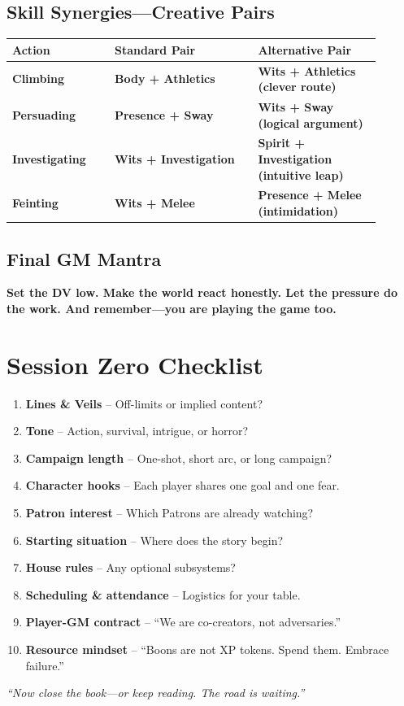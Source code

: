 \documentclass[10pt,twocolumn]{article} %
\begin{document}
\subsection{Skill Synergies---Creative Pairs}
\begin{coretable}
\begin{tabular}{>{\bfseries}p{0.25\linewidth} >{\bfseries}p{0.35\linewidth} >{\bfseries}p{0.3\linewidth}}
\toprule
\textbf{Action} & \textbf{Standard Pair} & \textbf{Alternative Pair} \\
\midrule
Climbing & Body + Athletics & Wits + Athletics (clever route) \\
Persuading & Presence + Sway & Wits + Sway (logical argument) \\
Investigating & Wits + Investigation & Spirit + Investigation (intuitive leap) \\
Feinting & Wits + Melee & Presence + Melee (intimidation) \\
\bottomrule
\end{tabular}
\end{coretable}

\subsection{Final GM Mantra}
\begin{sidebar}
    \textbf{Set the DV low. Make the world react honestly. Let the pressure do the work. And remember---you are playing the game too.}
\end{sidebar}

\section{Session Zero Checklist}
\begin{enumerate}[leftmargin=*]
    \item \textbf{Lines \& Veils} -- Off-limits or implied content?
    \item \textbf{Tone} -- Action, survival, intrigue, or horror?
    \item \textbf{Campaign length} -- One-shot, short arc, or long campaign?
    \item \textbf{Character hooks} -- Each player shares one goal and one fear.
    \item \textbf{Patron interest} -- Which Patrons are already watching?
    \item \textbf{Starting situation} -- Where does the story begin?
    \item \textbf{House rules} -- Any optional subsystems?
    \item \textbf{Scheduling \& attendance} -- Logistics for your table.
    \item \textbf{Player-GM contract} -- ``We are co-creators, not adversaries.''
    \item \textbf{Resource mindset} -- ``Boons are not XP tokens. Spend them. Embrace failure.''
\end{enumerate}
\textit{``Now close the book---or keep reading. The road is waiting.''}
\end{document}

